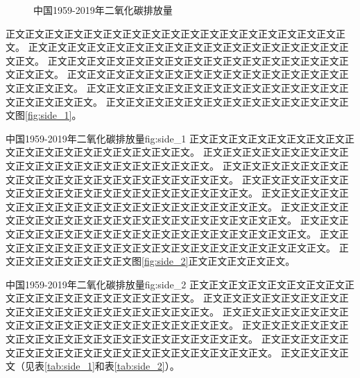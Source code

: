 \begin{figure}[H]
  \caption{中国1959-2019年二氧化碳排放量\label{fig:CO_2}}
\end{figure}

正文正文正文正文正文正文正文正文正文正文正文正文正文正文正文正文正文正文。
正文正文正文正文正文正文正文正文正文正文正文正文正文正文正文正文正文正文。
正文正文正文正文正文正文正文正文正文正文正文正文正文正文正文正文正文正文。
正文正文正文正文正文正文正文正文正文正文正文正文正文正文正文正文正文正文。
正文正文正文正文正文正文正文正文正文正文正文正文正文正文正文正文正文正文。
正文正文正文正文正文正文正文正文正文正文正文正文正文图\ref{fig:side_1}。

{中国1959-2019年二氧化碳排放量}{fig:side_1}
\vspace{-5ex}
正文正文正文正文正文正文正文正文正文正文正文正文正文正文正文正文正文正文。
正文正文正文正文正文正文正文正文正文正文正文正文正文正文正文正文正文正文。
正文正文正文正文正文正文正文正文正文正文正文正文正文正文正文正文正文正文。
正文正文正文正文正文正文正文正文正文正文正文正文正文正文正文正文正文正文。
正文正文正文正文正文正文正文正文正文正文正文正文正文正文正文正文正文正文。
正文正文正文正文正文正文正文正文正文正文正文正文正文正文正文正文正文正文。
正文正文正文正文正文正文正文正文正文正文正文正文正文正文正文正文正文正文。
正文正文正文正文正文正文正文正文正文正文正文正文正文正文正文正文正文正文。
正文正文正文正文正文正文正文图\ref{fig:side_2}正文正文正文正文正文。

{中国1959-2019年二氧化碳排放量}{fig:side_2}
\vspace{-5ex}
正文正文正文正文正文正文正文正文正文正文正文正文正文正文正文正文正文正文。
正文正文正文正文正文正文正文正文正文正文正文正文正文正文正文正文正文正文。
正文正文正文正文正文正文正文正文正文正文正文正文正文正文正文正文正文正文。
正文正文正文正文正文正文正文正文正文正文正文正文正文正文正文正文正文正文。
正文正文正文正文正文正文正文正文正文正文正文正文正文正文正文正文正文正文。
正文正文正文正文（见表\ref{tab:side_1}和表\ref{tab:side_2}）。

